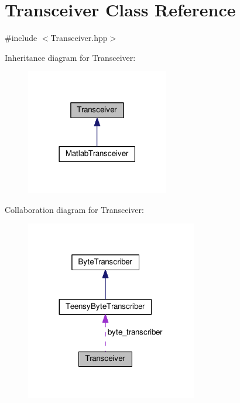 \hypertarget{classTransceiver}{}\section{Transceiver Class Reference}
\label{classTransceiver}


{\ttfamily \#include $<$Transceiver.\+hpp$>$}



Inheritance diagram for Transceiver\+:\nopagebreak
\begin{figure}[H]
\begin{center}
\leavevmode
\includegraphics[width=177pt]{classTransceiver__inherit__graph}
\end{center}
\end{figure}


Collaboration diagram for Transceiver\+:\nopagebreak
\begin{figure}[H]
\begin{center}
\leavevmode
\includegraphics[width=212pt]{classTransceiver__coll__graph}
\end{center}
\end{figure}
